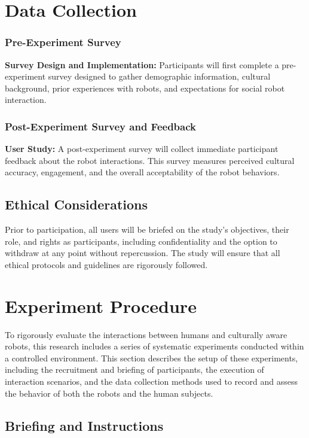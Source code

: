 \section{Data Collection}

\subsubsection{Pre-Experiment Survey}

\textbf{Survey Design and Implementation:} Participants will first complete a pre-experiment survey designed to gather demographic information, cultural background, prior experiences with robots, and expectations for social robot interaction.

\subsubsection{Post-Experiment Survey and Feedback}

\textbf{User Study:} A post-experiment survey will collect immediate participant feedback about the robot interactions. This survey measures perceived cultural accuracy, engagement, and the overall acceptability of the robot behaviors.

\subsection{Ethical Considerations}

Prior to participation, all users will be briefed on the study's objectives, their role, and rights as participants, including confidentiality and the option to withdraw at any point without repercussion. The study will ensure that all ethical protocols and guidelines are rigorously followed.

\section{Experiment Procedure}

To rigorously evaluate the interactions between humans and culturally aware robots, this research includes a series of systematic experiments conducted within a controlled environment. This section describes the setup of these experiments, including the recruitment and briefing of participants, the execution of interaction scenarios, and the data collection methods used to record and assess the behavior of both the robots and the human subjects.

\subsection{Briefing and Instructions}

